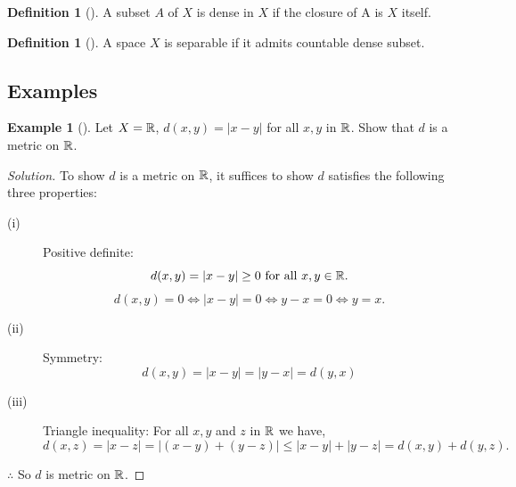 \documentclass[	DIV=calc,paper=a4,fontsize=11pt]{scrartcl}	 	%
\theoremstyle{definition}
\newtheorem{defn}[thm]{Definition}
\newtheorem{exmp}[thm]{Example}
\theoremstyle{plain}
\theoremstyle{remark}
\begin{document}
\begin{defn}[\textbf{\color{blue}{Dense}}]
A subset  $A$ of $X$ is dense in $X$ if the closure of A is $X$ itself.
\end{defn}

\begin{defn}[\textbf{\color{blue}{Separable}}]
A space $X$ is separable if it admits countable dense subset.
\end{defn}

\subsection{Examples}
\begin{exmp}[]
Let $X=\Bbb R$, $d(x,y)=|x-y|$ for all $x,y$ in $\Bbb R$. Show that $d$ is a metric on $\Bbb R$.
\end{exmp}
\begin{proof}[Solution]
To show $d$ is a metric on $\Bbb R$, it suffices to show $d$ satisfies the following three properties:
\begin{description}
  \item[(i)] Positive definite:
\[d(x,y)= |x-y|\ge 0 \text{ for all }  x , y \in \Bbb R.\]
\[d(x,y) = 0\Leftrightarrow |x-y| = 0 \Leftrightarrow y-x = 0 \Leftrightarrow y = x.\]
  \item[(ii)] Symmetry:
\[d(x,y) = |x-y|=|y-x|= d(y,x)\]
  \item[(iii)] Triangle inequality: For all $x,y$ and $z$ in $\Bbb R$ we have,
\[d(x,z) = |x-z|= |(x-y)+(y-z)|\le |x-y|+ |y-z| = d(x,y)+d(y,z).\]
\end{description}
$\therefore$ So $d$ is metric on $\Bbb R$.
\end{proof}
\end{document}
